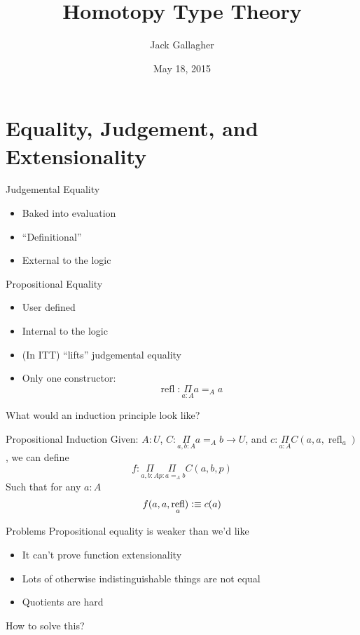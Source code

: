 \documentclass[xcolor=svgnames]{beamer}
\title
  [Homotopy Type Theory\hspace{2em}]
  {Homotopy Type Theory}
\author
  [Jack Gallagher]
  {Jack Gallagher}
\date{May 18, 2015}
\DeclareMathOperator{\refl}{refl}
\newcommand{\defeq}{\vcentcolon\equiv}
\begin{document}
\maketitle

\section{Equality, Judgement, and Extensionality}
\begin{frame}{Judgemental Equality}
  \begin{itemize}
  \item Baked into evaluation
  \item ``Definitional''
  \item External to the logic
  \end{itemize}
\end{frame}

\begin{frame}{Propositional Equality}
  \begin{itemize}
  \item User defined
  \item Internal to the logic
  \item (In ITT) ``lifts'' judgemental equality
  \item Only one constructor: \pause
    $$ \refl : \underset{a:A}\Pi a =_A a $$
  \end{itemize} \pause

  What would an induction principle look like?
\end{frame}

\begin{frame}{Propositional Induction}
  Given: $A : U$, $C : \underset{a,b : A}\Pi a =_A b \to U$,
  and $c : \underset{a:A}\Pi C(a,a,\refl_a)$, we can define
  $$ f : \underset{a,b:A}\Pi \underset{p : a =_A b}\Pi C(a,b,p) $$
  Such that for any $a:A$
  $$ f(a,a,\refl_a) \defeq c(a) $$
\end{frame}

\begin{frame}{Problems}
  Propositional equality is weaker than we'd like
  \begin{itemize}
  \item It can't prove function extensionality \pause
  \item Lots of otherwise indistinguishable things are not equal \pause
  \item Quotients are hard \pause
  \end{itemize}

  How to solve this?
\end{frame}
\end{document}
